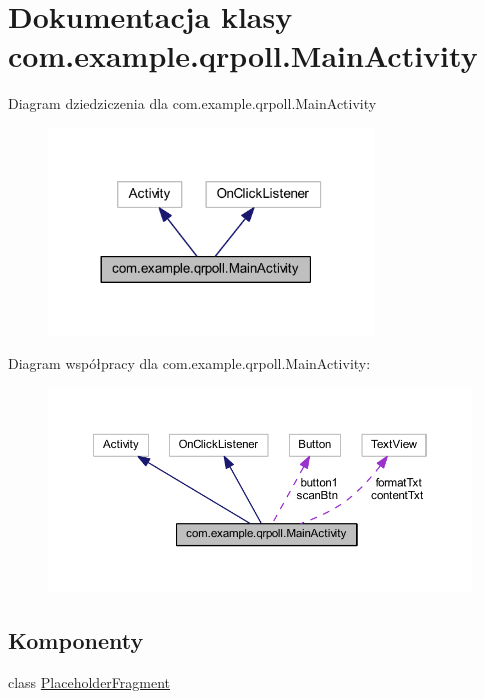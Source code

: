 \hypertarget{classcom_1_1example_1_1qrpoll_1_1_main_activity}{\section{Dokumentacja klasy com.\+example.\+qrpoll.\+Main\+Activity}
\label{classcom_1_1example_1_1qrpoll_1_1_main_activity}
}


Diagram dziedziczenia dla com.\+example.\+qrpoll.\+Main\+Activity
\nopagebreak
\begin{figure}[H]
\begin{center}
\leavevmode
\includegraphics[width=245pt]{classcom_1_1example_1_1qrpoll_1_1_main_activity__inherit__graph}
\end{center}
\end{figure}


Diagram współpracy dla com.\+example.\+qrpoll.\+Main\+Activity\+:
\nopagebreak
\begin{figure}[H]
\begin{center}
\leavevmode
\includegraphics[width=350pt]{classcom_1_1example_1_1qrpoll_1_1_main_activity__coll__graph}
\end{center}
\end{figure}
\subsection*{Komponenty}
\begin{DoxyCompactItemize}
\item 
class \hyperlink{classcom_1_1example_1_1qrpoll_1_1_main_activity_1_1_placeholder_fragment}{Placeholder\+Fragment}
\end{DoxyCompactItemize}
